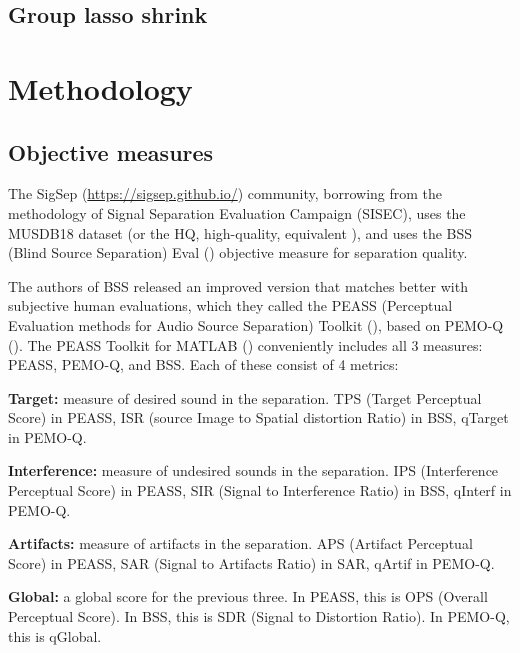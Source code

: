 \documentclass[10pt,letter]{article}
\newenvironment{tight_itemize}{
\begin{itemize}
\setlength{\itemsep}{0pt}
\setlength{\parskip}{0pt}
}{\end{itemize}}
\begin{document}
\subsection{Group lasso shrink}

\section{Methodology}
\label{sec:methodology}

\subsection{Objective measures}

The SigSep (\href{https://sigsep.github.io/}{https://sigsep.github.io/}) community, borrowing from the methodology of Signal Separation Evaluation Campaign (SISEC), uses the MUSDB18 dataset \cite{musdb18} (or the HQ, high-quality, equivalent \cite{musdb18-hq}), and uses the BSS (Blind Source Separation) Eval (\cite{bss}) objective measure for separation quality.

The authors of BSS released an improved version that matches better with subjective human evaluations, which they called the PEASS (Perceptual Evaluation methods for Audio Source Separation) Toolkit (\cite{peass}), based on PEMO-Q (\cite{pemoq}). The PEASS Toolkit for MATLAB (\cite{peassmatlab}) conveniently includes all 3 measures: PEASS, PEMO-Q, and BSS. Each of these consist of 4 metrics:

\begin{tight_itemize}
\vspace{-0.5em}
\item
	\textbf{Target:} measure of desired sound in the separation. TPS (Target Perceptual Score) in PEASS, ISR (source Image to Spatial distortion Ratio) in BSS, qTarget in PEMO-Q.
\item
	\textbf{Interference:} measure of undesired sounds in the separation. IPS (Interference Perceptual Score) in PEASS, SIR (Signal to Interference Ratio) in BSS, qInterf in PEMO-Q.
\item
	\textbf{Artifacts:} measure of artifacts in the separation. APS (Artifact Perceptual Score) in PEASS, SAR (Signal to Artifacts Ratio) in SAR, qArtif in PEMO-Q.
\item
	\textbf{Global:} a global score for the previous three. In PEASS, this is OPS (Overall Perceptual Score). In BSS, this is SDR (Signal to Distortion Ratio). In PEMO-Q, this is qGlobal.
\end{tight_itemize}
\end{document}
